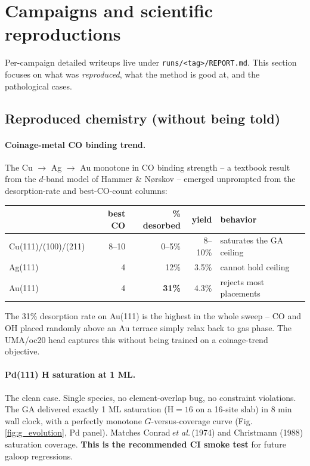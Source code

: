 \documentclass[11pt,a4paper]{article}
\begin{document}
\section{Campaigns and scientific reproductions}
\label{sec:campaigns}

Per-campaign detailed writeups live under
\texttt{runs/<tag>/REPORT.md}. This section focuses on what was
\emph{reproduced}, what the method is good at, and the pathological
cases.

\subsection{Reproduced chemistry (without being told)}

\paragraph{Coinage-metal CO binding trend.} The Cu $\to$ Ag $\to$ Au
monotone in CO binding strength -- a textbook result from the
$d$-band model of Hammer \& N\o{}rskov -- emerged unprompted from
the desorption-rate and best-CO-count columns:

\begin{center}\small
\begin{tabular}{lrrrl}
\toprule
                  & best CO & \% desorbed & yield & behavior \\
\midrule
Cu(111)/(100)/(211)& 8--10   &     0--5\%  & 8--10\% & saturates the GA ceiling   \\
Ag(111)           &   4     &       12\%  &  3.5\% & cannot hold ceiling        \\
Au(111)           &   4     &    \textbf{31\%}  &  4.3\% & rejects most placements \\
\bottomrule
\end{tabular}
\end{center}

\noindent The 31\% desorption rate on Au(111) is the highest in the
whole sweep -- CO and OH placed randomly above an Au terrace simply
relax back to gas phase. The UMA/oc20 head captures this without
being trained on a coinage-trend objective.

\paragraph{Pd(111) H saturation at 1 ML.} The clean case. Single
species, no element-overlap bug, no constraint violations. The GA
delivered exactly 1 ML saturation (H$=16$ on a 16-site slab) in
8 min wall clock, with a perfectly monotone $G$-versus-coverage
curve (Fig.\,\ref{fig:g_evolution}, Pd panel). Matches
Conrad\,\textit{et al.}\,(1974) and Christmann (1988) saturation
coverage. \textbf{This is the recommended CI smoke test} for future
galoop regressions.
\end{document}
